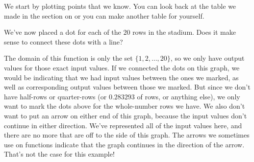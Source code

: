 \documentclass{ximera}
\begin{document}
\begin{example}
We start by plotting points that we know. You can look back at the table we made in the section on  or you can make another table for yourself.
\begin{image}
\end{image}
We've now placed a dot for each of the $20$ rows in the stadium. Does it make sense to connect these dots with a line?
\begin{multipleChoice}
\begin{feedback}[correct]
The domain of this function is only the set $\{1, 2, \dots, 20\}$, so we only have output values for those exact input values. If we connected the dots on this graph, we would be indicating that we had input values between the ones we marked, as well as corresponding output values between those we marked. But since we don't have half-rows or quarter-rows (or $0.283293$ of rows, or anything else), we only want to mark the dots above for the whole-number rows we have. We also don't want to put an arrow on either end of this graph, because the input values don't continue in either direction. We've represented all of the input values here, and there are no more that are off to the side of this graph. The arrows we sometimes use on functions indicate that the graph continues in the direction of the arrow. That's not the case for this example!
\end{feedback}
\end{multipleChoice}

\end{example}
\end{document}
